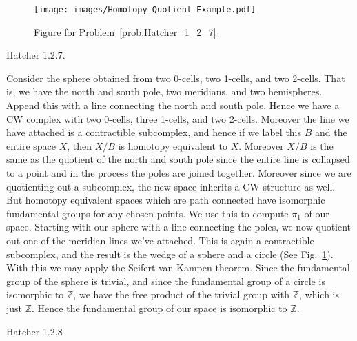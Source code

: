     \begin{figure}[H]
        \centering
        \captionsetup{type=figure}
        \texttt{[image: images/Homotopy\_Quotient\_Example.pdf]}
        \caption{Figure for Problem~\ref{prob:Hatcher_1_2_7}}
        \label{fig:Fig_Prob_Hatcher_1_2_7}
    \end{figure}
    \begin{problem}
        \label{prob:Hatcher_1_2_7}%
        Hatcher 1.2.7.
    \end{problem}
    \begin{solution}
        Consider the sphere obtained from two 0-cells, two 1-cells, and two
        2-cells. That is, we have the north and south pole, two meridians, and
        two hemispheres. Append this with a line connecting the north and south
        pole. Hence we have a CW complex with two 0-cells, three
        1-cells, and two 2-cells. Moreover the line we have attached is a
        contractible subcomplex, and hence if we label this $B$ and the entire
        space $X$, then $X/B$ is homotopy equivalent to $X$. Moreover $X/B$ is
        the same as the quotient of the north and south pole since the entire
        line is collapsed to a point and in the process the poles are joined
        together. Moreover since we are quotienting out a subcomplex, the new
        space inherits a CW structure as well. But homotopy equivalent spaces
        which are path connected have isomorphic fundamental groups for any
        chosen points. We use this to compute $\pi_{1}$ of our space. Starting
        with our sphere with a line connecting the poles, we now quotient out
        one of the meridian lines we've attached. This is again a contractible
        subcomplex, and the result is the wedge of a sphere and a circle
        (See Fig.~\ref{fig:Fig_Prob_Hatcher_1_2_7}). With this we may apply the
        Seifert van-Kampen theorem. Since the fundamental group of the sphere is
        trivial, and since the fundamental group of a circle is isomorphic to
        $\mathbb{Z}$, we have the free product of the trivial group with
        $\mathbb{Z}$, which is just $\mathbb{Z}$. Hence the fundamental group of
        our space is isomorphic to $\mathbb{Z}$.
    \end{solution}
    \begin{problem}
        \label{prob:Hatcher_1_2_8}%
        Hatcher 1.2.8
    \end{problem}
